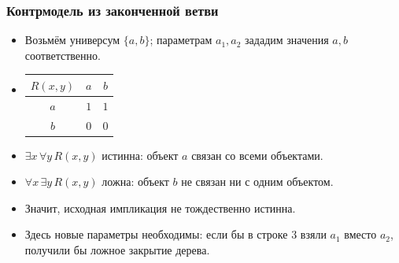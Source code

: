 \documentclass[10pt]{beamer}
\begin{document}
\begin{frame}
\frametitle{Контрмодель из законченной ветви}
\begin{itemize}
    \item Возьмём универсум $\{a,b\}$; параметрам $a_1,a_2$ зададим значения $a,b$ соответственно.
    \item[] {\setlength{\tabcolsep}{1em}
    \begin{tabular}{c|c|c}
        $R(x,y)$ & $a$ & $b$ \\ \hline
        $a$ & $1$ & $1$ \\
        $b$ & $0$ & $0$
    \end{tabular}}
    \pause
    \item $\exists x\,\forall y\,R(x,y)$ истинна: объект $a$ связан со всеми объектами.
    \item $\forall x\,\exists y\,R(x,y)$ ложна: объект $b$ не связан ни с одним объектом.
    \pause
    \item Значит, исходная импликация не тождественно истинна.
    \item Здесь новые параметры необходимы: если бы в строке 3 взяли $a_1$ вместо $a_2$, получили бы ложное закрытие дерева.
\end{itemize}
\end{frame}
\end{document}
